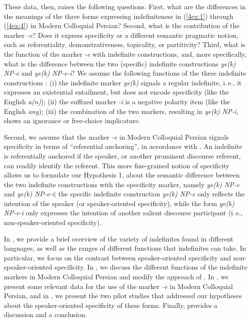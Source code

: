 \documentclass[output=paper]{langsci/langscibook}
\begin{document}
These data, then, raises the following questions. First, what are the differences in the meanings of the three forms expressing indefiniteness in (\ref{4ex:1}) through (\ref{4ex:4}) in Modern Colloquial Persian? Second, what is the contribution of the marker {\emph{-e}}? Does it express specificity or a different semantic pragmatic notion, such as referentiality, demonstrativeness, topicality, or partitivity? Third, what is the function of the marker {\emph{-e}} with indefinite constructions, and, more specifically, what is the difference between the two (specific) indefinite constructions {\emph{ye(k) NP-e}} and {\emph{ye(k) NP-e-i}}? We assume the following functions of the three indefinite constructions \citep[cf.][]{jasbi:14,lyons:99,windfuhr:79}: (i) the indefinite marker {\emph{ye(k)}} signals a regular indefinite, i.\,e., it expresses an existential entailment, but does not encode specificity (like the English {\emph{a(n)}}); (ii) the suffixed marker {\emph{-i}} is a negative polarity item (like the English {\emph{any}}); (iii) the combination of the two markers, resulting in {\emph{ye(k) NP-i}}, shows an ignorance or free-choice implicature.


Second, we assume that the marker {\emph{-e}} in Modern Colloquial Persian signals specificity in terms of ``referential anchoring'', in accordance with \cite{vonheus:02url}. An indefinite is referentially anchored if the speaker, or another prominent discourse referent, can readily identify the referent. This more fine-grained notion of specificity allows us to formulate our Hypothesis 1, about the semantic difference between the two indefinite constructions with the specificity marker, namely {\emph{ye(k) NP-e}} and {\emph{ye(k) NP-e-i}}; the specific indefinite construction {\emph{ye(k) NP-e}} only reflects the intention of the speaker (or speaker-oriented specificity), while the form {\emph{ye(k) NP-e-i}} only expresses the intention of another salient discourse participant (i.\,e., non-speaker-oriented specificity).

In , we provide a brief overview of the variety of indefinites found in different languages, as well as the ranges of different functions that indefinites can take. In particular, we focus on the contrast between speaker-oriented specificity and non-speaker-oriented specificity. In , we discuss the different functions of the indefinite markers in Modern Colloquial Persian and modify the approach of \cite{jasbi:16}. In , we present some relevant data for the use of the marker {\emph{-e}} in Modern Colloquial Persian, and in , we present the two pilot studies that addressed our hypotheses about the speaker-oriented specificity of these forms. Finally,  provides a discussion and a conclusion.
\end{document}
